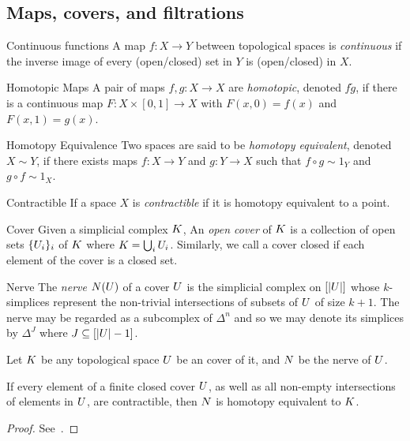 \subsection{Maps, covers, and filtrations}
\begin{definition}{Continuous functions}
A map $f: X \rightarrow Y$ between topological spaces is \emph{continuous} if the inverse image of every (open/closed) set in $Y$ is (open/closed) in $X$. 
\end{definition}
\begin{definition}{Homotopic Maps}
A pair of maps $f,g: X \rightarrow X$ are \emph{homotopic}, denoted $f \tilde g$, if there is a continuous map $F: X \times [0,1] \rightarrow X$ with $F(x,0) = f(x)$ and $F(x,1) = g(x)$. 
\end{definition}
\begin{definition}{Homotopy Equivalence}
Two spaces are said to be \emph{homotopy equivalent}, denoted $X \sim Y$, if there exists maps $f: X \rightarrow Y$ and $g: Y \rightarrow X$ such that $f \circ g \sim 1_Y$ and $g \circ f \sim 1_X$.
\end{definition}
\begin{definition}{Contractible}
If a space $X$ is \emph{contractible} if it is homotopy equivalent to a point.
\end{definition}
\begin{definition}{Cover}
Given a simplicial complex $K$, An \emph{open cover} of $K$ is a collection of open sets $\{U_i\}_i$ of $K$ where $K = \bigcup_i U_i$. Similarly, we call a cover closed if each element of the cover is a closed set.
\end{definition}
\begin{definition}{Nerve}
The \emph{nerve} $N(U)$ of a cover $U$ is the simplicial complex on $[|U|]$ whose $k$-simplices represent the non-trivial intersections of subsets of $U$ of size $k+1$. The nerve may be regarded as a subcomplex of $\Delta^n$ and so we may denote its simplices by $\Delta^J$ where $J \subseteq [|U|-1]$.
\end{definition}
Let $K$ be any topological space $U$ be an cover of it, and $N$ be the nerve of $U$. 
\begin{lemma}
If every element of a finite closed cover $U$, as well as all non-empty intersections of elements in $U$, are contractible, then $N$ is homotopy equivalent to $K$.
\end{lemma}
\begin{proof}
See~\cite{hatcher}.
\end{proof}

